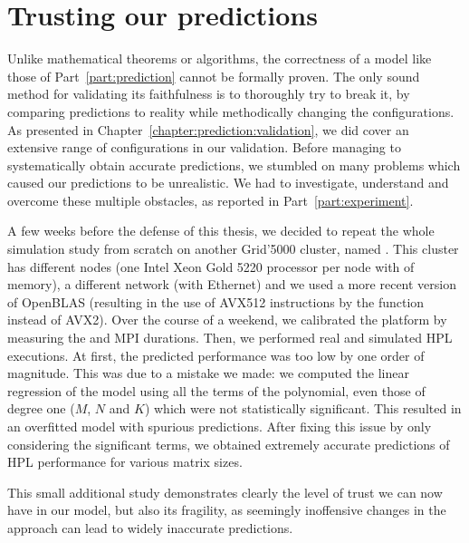    \section{Trusting our predictions}%
    \label{sec:prediction_trust}

        Unlike mathematical theorems or algorithms, the correctness of a model like those of Part~\ref{part:prediction}
        cannot be formally proven. The only sound method for validating its faithfulness is to thoroughly try to break
        it, by comparing predictions to reality while methodically changing the configurations. As presented in
        Chapter~\ref{chapter:prediction:validation}, we did cover an extensive range of configurations in our
        validation. Before managing to systematically obtain accurate predictions, we stumbled on many problems which
        caused our predictions to be unrealistic. We had to investigate, understand and overcome these multiple
        obstacles, as reported in Part~\ref{part:experiment}.

        A few weeks before the defense of this thesis, we decided to repeat the whole simulation study from scratch on
        another Grid'5000 cluster, named \gros. This cluster has different nodes (one Intel Xeon Gold 5220 processor per
        node with  of memory), a different network (with  Ethernet) and
        we used a more recent version of OpenBLAS (resulting in the use of AVX512 instructions by the \dgemm function
        instead of AVX2). Over the course of a weekend, we calibrated the platform by measuring the \dgemm and MPI
        durations. Then, we performed real and simulated HPL executions. At first, the predicted performance was too low
        by one order of magnitude. This was due to a mistake we made: we computed the linear regression of the \dgemm
        model using all the terms of the polynomial, even those of degree one (\ie \(M\), \(N\) and \(K\)) which were
        not statistically significant. This resulted in an overfitted model with spurious predictions.  After fixing
        this issue by only considering the significant terms, we obtained extremely accurate predictions of HPL
        performance for various matrix sizes.

        This small additional study demonstrates clearly the level of trust we can now have in our model, but also its
        fragility, as seemingly inoffensive changes in the approach can lead to widely inaccurate predictions.

